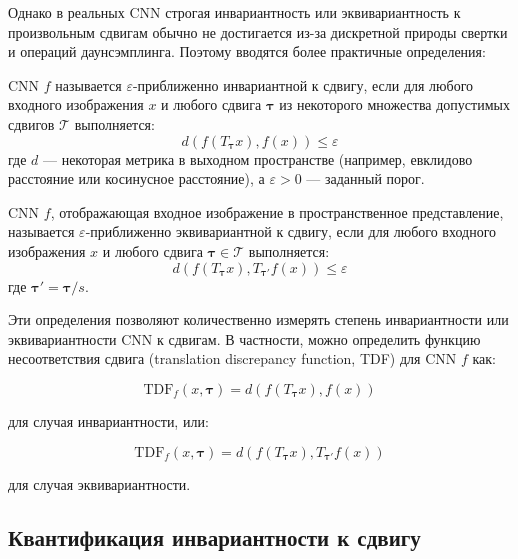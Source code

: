 Однако в реальных CNN строгая инвариантность или эквивариантность к произвольным сдвигам обычно не достигается из-за дискретной природы свертки и операций даунсэмплинга. Поэтому вводятся более практичные определения:

\begin{definition}
CNN $f$ называется $\varepsilon$-приближенно инвариантной к сдвигу, если для любого входного изображения $x$ и любого сдвига $\boldsymbol{\tau}$ из некоторого множества допустимых сдвигов $\mathcal{T}$ выполняется:
\begin{equation}
d(f(T_{\boldsymbol{\tau}}x), f(x)) \leq \varepsilon
\end{equation}
где $d$ — некоторая метрика в выходном пространстве (например, евклидово расстояние или косинусное расстояние), а $\varepsilon > 0$ — заданный порог.
\end{definition}

\begin{definition}
CNN $f$, отображающая входное изображение в пространственное представление, называется $\varepsilon$-приближенно эквивариантной к сдвигу, если для любого входного изображения $x$ и любого сдвига $\boldsymbol{\tau} \in \mathcal{T}$ выполняется:
\begin{equation}
d(f(T_{\boldsymbol{\tau}}x), T_{\boldsymbol{\tau}'}f(x)) \leq \varepsilon
\end{equation}
где $\boldsymbol{\tau}' = \boldsymbol{\tau} / s$.
\end{definition}

Эти определения позволяют количественно измерять степень инвариантности или эквивариантности CNN к сдвигам. В частности, можно определить функцию несоответствия сдвига (translation discrepancy function, TDF) для CNN $f$ как:

\begin{equation}
\text{TDF}_f(x, \boldsymbol{\tau}) = d(f(T_{\boldsymbol{\tau}}x), f(x))
\end{equation}

для случая инвариантности, или:

\begin{equation}
\text{TDF}_f(x, \boldsymbol{\tau}) = d(f(T_{\boldsymbol{\tau}}x), T_{\boldsymbol{\tau}'}f(x))
\end{equation}

для случая эквивариантности.

\subsection{Квантификация инвариантности к сдвигу}
\label{theory:formal_definition:quantification}

